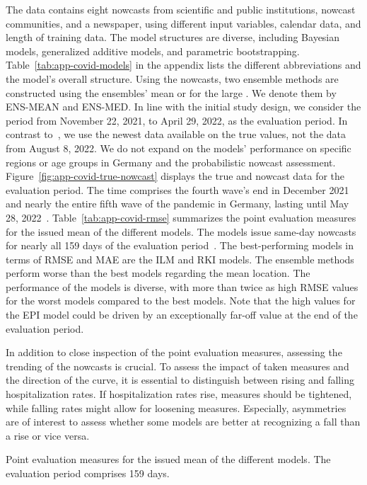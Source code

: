 The data contains eight nowcasts from scientific and public institutions, nowcast communities, and a newspaper, using different input variables, calendar data, and length of training data.
The model structures are diverse, including Bayesian models, generalized additive models, and parametric bootstrapping.
Table~\ref{tab:app-covid-models} in the appendix lists the different abbreviations and the model's overall structure.
Using the nowcasts, two ensemble methods are constructed using the ensembles' mean or for the large .
We denote them by ENS-MEAN and ENS-MED.
In line with the initial study design, we consider the period from November 22, 2021, to April 29, 2022, as the evaluation period.
In contrast to~\textcite{Wolffram2023}, we use the newest data available on the true values, not the data from August 8, 2022.
We do not expand on the models' performance on specific regions or age groups in Germany and the probabilistic nowcast assessment.
Figure~\ref{fig:app-covid-true-nowcast} displays the true and nowcast data for the evaluation period.
The time comprises the fourth wave's end in December 2021 and nearly the entire fifth wave of the pandemic in Germany, lasting until May 28, 2022~\parencite{Tolksdorf2022}.
Table~\ref{tab:app-covid-rmse} summarizes the point evaluation measures for the issued mean of the different models.
The models issue same-day nowcasts for nearly all 159 days of the evaluation period~\parencite[see][Tables A2, A3, and A4]{Wolffram2023}.
The best-performing models in terms of RMSE and MAE are the ILM and RKI models.
The ensemble methods perform worse than the best models regarding the mean location.
The performance of the models is diverse, with more than twice as high RMSE values for the worst models compared to the best models.
Note that the high values for the EPI model could be driven by an exceptionally far-off value at the end of the evaluation period.

In addition to close inspection of the point evaluation measures, assessing the trending of the nowcasts is crucial.
To assess the impact of taken measures and the direction of the curve, it is essential to distinguish between rising and falling hospitalization rates.
If hospitalization rates rise, measures should be tightened, while falling rates might allow for loosening measures.
Especially, asymmetries are of interest to assess whether some models are better at recognizing a fall than a rise or vice versa.

\begin{table}[]
    \centering
    
    \caption{Point evaluation measures for the issued mean of the different models. The evaluation period comprises 159 days. }
    \label{tab:app-covid-rmse}
\end{table}

